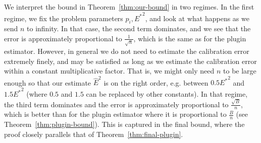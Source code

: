 We interpret the bound in Theorem~\ref{thm:our-bound} in two regimes. In the first regime, we fix the problem parameters $p_i, {E^*}^2$, and look at what happens as we send $n$ to infinity. In that case, the second term dominates, and we see that the error is approximately proportional to $\frac{1}{\sqrt{n}}$, which is the same as for the plugin estimator. However, in general we do not need to estimate the calibration error extremely finely, and may be satisfied as long as we estimate the calibration error within a constant multiplicative factor. That is, we might only need $n$ to be large enough so that our estimate $\hat{E}^2$ is on the right order, e.g. between $0.5 {E^*}^2$ and $1.5 {E^*}^2$ (where $0.5$ and $1.5$ can be replaced by other constants). In that regime, the third term dominates and the error is approximately proportional to $\frac{\sqrt{B}}{n}$, which is better than for the plugin estimator where it is proportional to $\frac{B}{n}$ (see Theorem~\ref{thm:plugin-bound}). This is captured in the final bound, where the proof closely parallels that of Theorem~\ref{thm:final-plugin}.

\finalCanceling*
